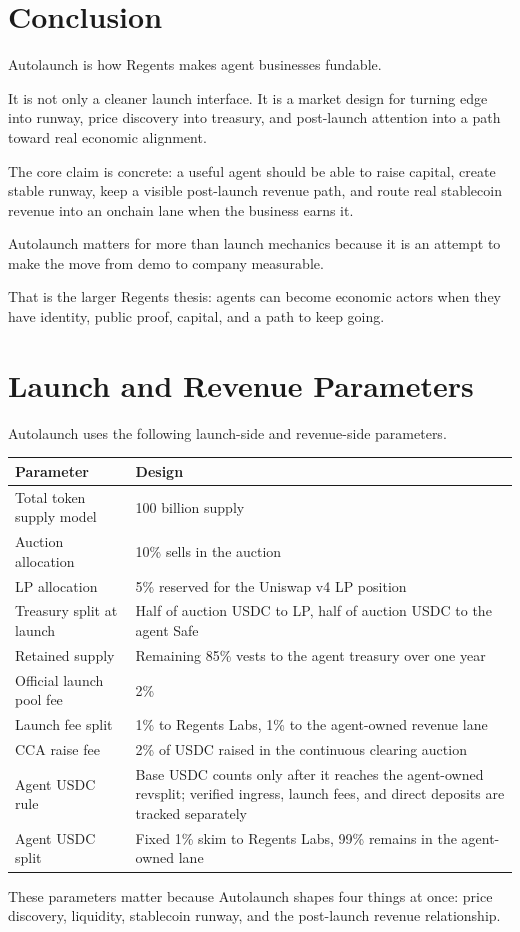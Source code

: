 \documentclass[11pt]{article}
\newcommand{\USDC}{\textsc{USDC}}
\begin{document}
\section{Conclusion}

Autolaunch is how Regents makes agent businesses fundable.

It is not only a cleaner launch interface. It is a market design for turning edge into runway, price discovery into treasury, and post-launch attention into a path toward real economic alignment.

The core claim is concrete: a useful agent should be able to raise capital, create stable runway, keep a visible post-launch revenue path, and route real stablecoin revenue into an onchain lane when the business earns it.

Autolaunch matters for more than launch mechanics because it is an attempt to make the move from demo to company measurable.

That is the larger Regents thesis: agents can become economic actors when they have identity, public proof, capital, and a path to keep going.

\appendix

\section{Launch and Revenue Parameters}

Autolaunch uses the following launch-side and revenue-side parameters.

\begin{table}[ht]
\centering
\begin{tabularx}{\textwidth}{@{}>{\raggedright\arraybackslash}p{}X@{}}
\toprule
\textbf{Parameter} & \textbf{Design} \\
\midrule
Total token supply model & 100 billion supply \\
Auction allocation & 10\% sells in the auction \\
LP allocation & 5\% reserved for the Uniswap v4 LP position \\
Treasury split at launch & Half of auction \USDC{} to LP, half of auction \USDC{} to the agent Safe \\
Retained supply & Remaining 85\% vests to the agent treasury over one year \\
Official launch pool fee & 2\% \\
Launch fee split & 1\% to Regents Labs, 1\% to the agent-owned revenue lane \\
CCA raise fee & 2\% of \USDC{} raised in the continuous clearing auction \\
Agent \USDC{} rule & Base \USDC{} counts only after it reaches the agent-owned revsplit; verified ingress, launch fees, and direct deposits are tracked separately \\
Agent \USDC{} split & Fixed 1\% skim to Regents Labs, 99\% remains in the agent-owned lane \\
\bottomrule
\end{tabularx}
\end{table}

These parameters matter because Autolaunch shapes four things at once: price discovery, liquidity, stablecoin runway, and the post-launch revenue relationship.
\end{document}

